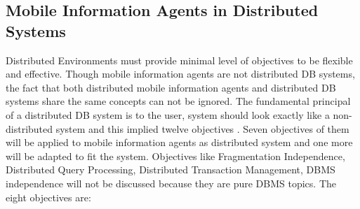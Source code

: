 \documentclass[12pt,a4paper,final,twoside,onecolumn,titlepage]{book}
\begin{document}
\subsection{Mobile Information Agents in Distributed Systems}
Distributed Environments must provide minimal level of objectives to be flexible and effective. Though mobile information agents are not distributed \gls{DB} systems, the fact that both distributed mobile information agents and distributed \gls{DB} systems share the same concepts can not be ignored. The fundamental principal of a distributed \gls{DB} system is to the user, system should look exactly like a non-distributed system and this implied twelve objectives \cite{M37}. Seven objectives of them will be applied to mobile information agents as distributed system and one more will be adapted to fit the system. Objectives like Fragmentation Independence, Distributed Query Processing, Distributed Transaction Management, \gls{DBMS} independence will not be discussed because they are pure \gls{DBMS} topics. The eight objectives are:
\end{document}
